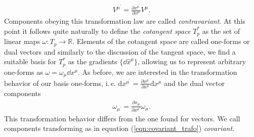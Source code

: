 \begin{align}
	V^{\mu^{\prime}}=\frac{\partial x^{\mu^{\prime}}}{\partial x^{\mu}} V^{\mu}. \label{eqn:contravariant_trafo}
\end{align}
Components obeying this transformation law are called \textit{contravariant}. At this point it follows quite naturally to define the \textit{cotangent space} $T_p^*$ as the set of linear maps $\omega: T_p \rightarrow \mathbb{R}$. Elements of the cotangent space are called one-forms or dual vectors and similarly to the discussion of the tangent space, we find a suitable basis for $T_p^*$ as the gradients $\{\dd\hat{x}^{\mu}\}$, allowing us to represent arbitrary one-forms as $\omega = \omega_{\mu} \dd x^{\mu}$. As before, we are interested in the transformation behavior of our basis one-forms, i.\,e. $\mathrm{d} x^{\mu^{\prime}}=\frac{\partial x^{\mu^{\prime}}}{\partial x^{\mu}} \mathrm{d} x^{\mu}$ and the dual vector components
\begin{align}
	\omega_{\mu^{\prime}}=\frac{\partial x_{\mu}}{\partial x^{\mu^{\prime}}} \omega_{\mu}.\label{eqn:covariant_trafo}
\end{align}
This transformation behavior differs from the one found for vectors. We call components transforming as in equation (\ref{eqn:covariant_trafo}) \textit{covariant}.

